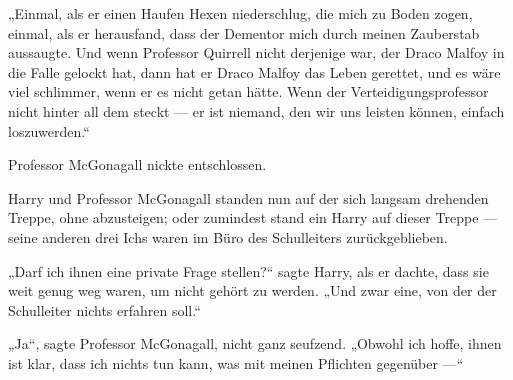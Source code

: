 „Einmal, als er einen Haufen Hexen niederschlug, die mich zu Boden zogen, einmal, als er herausfand, dass der Dementor mich durch meinen Zauberstab aussaugte. Und wenn Professor Quirrell nicht derjenige war, der Draco Malfoy in die Falle gelockt hat, dann hat er Draco Malfoy das Leben gerettet, und es wäre viel schlimmer, wenn er es nicht getan hätte. Wenn der Verteidigungsprofessor nicht hinter all dem steckt — er ist niemand, den wir uns leisten können, einfach loszuwerden.“

Professor McGonagall nickte entschlossen.


Harry und Professor McGonagall standen nun auf der sich langsam drehenden Treppe, ohne abzusteigen; oder zumindest stand ein Harry auf dieser Treppe — seine anderen drei Ichs waren im Büro des Schulleiters zurückgeblieben.

„Darf ich ihnen eine private Frage stellen?“ sagte Harry, als er dachte, dass sie weit genug weg waren, um nicht gehört zu werden.
„Und zwar eine, von der der Schulleiter nichts erfahren soll.“

„Ja“, sagte Professor McGonagall, nicht ganz seufzend.
„Obwohl ich hoffe, ihnen ist klar, dass ich nichts tun kann, was mit meinen Pflichten gegenüber —“

